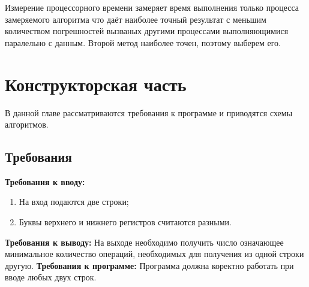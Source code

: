 \documentclass[12pt]{report}
\begin{document}
Измерение процессорного времени замеряет время выполнения только процесса замеряемого алгоритма что даёт наиболее точный результат с меньшим количеством погрешностей вызваных другими процессами выполняющимися паралельно с данным.
Второй метод наиболее точен, поэтому выберем его.


\chapter{Конструкторская часть}
В данной главе рассматриваются требования к программе и приводятся схемы алгоритмов.
\section{Требования}
\textbf{Требования к вводу:}
\begin{enumerate}
  	\item На вход подаются две строки;
	\item Буквы верхнего и нижнего регистров считаются разными.
\end{enumerate}
\textbf{Требования к выводу:}
  	На выходе необходимо получить число означающее минимальное количество операций, необходимых для получения из одной строки другую. 
\newline	
\newline	
\textbf{Требования к программе:}
  	Программа должна коректно работать при вводе любых двух строк.
\end{document}

